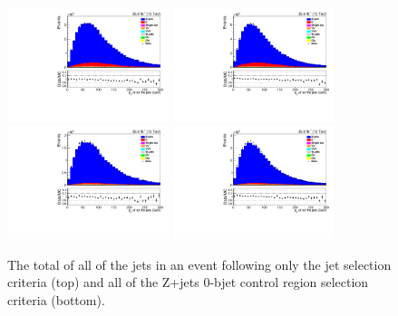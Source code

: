 \begin{figure}[ht]
\centering
\includegraphics[width=0.42\textwidth]{figs/background-estimation/plots/unblinded/DY_control_old_prompt_ee_DYamcatnlo/totalJetPt_SingleTop_jetSel_ee.pdf}
\includegraphics[width=0.42\textwidth]{figs/background-estimation/plots/unblinded/DY_control_old_prompt_mumu_DYamcatnlo/totalJetPt_SingleTop_jetSel_mumu.pdf}
\\
\includegraphics[width=0.42\textwidth]{figs/background-estimation/plots/unblinded/DY_control_old_prompt_ee_DYamcatnlo/totalJetPt_SingleTop_wMass_ee.pdf}
\includegraphics[width=0.42\textwidth]{figs/background-estimation/plots/unblinded/DY_control_old_prompt_mumu_DYamcatnlo/totalJetPt_SingleTop_wMass_mumu.pdf}
\caption{
The total \pT of all of the jets in an event following only the jet selection criteria (top) and all of the Z+jets 0-bjet control region selection criteria (bottom).
}
\label{fig:CR_NLO_totalJetPt}
\end{figure}


